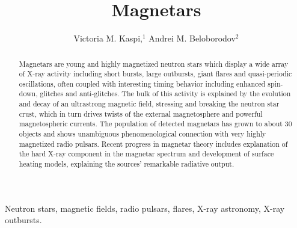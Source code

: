 \documentclass[letterpaper]{ar-1col}
\begin{document}

\title{Magnetars}


\author{Victoria M. Kaspi,$^1$ Andrei M. Beloborodov$^2$
}



\begin{abstract}
Magnetars are young and highly magnetized neutron stars which display
a wide array of X-ray activity including short bursts, large outbursts, giant flares
and quasi-periodic oscillations, often coupled with interesting timing behavior
including enhanced spin-down, glitches and anti-glitches. The bulk of this
activity is explained by the evolution and decay of an ultrastrong magnetic field,
stressing and breaking the neutron star crust, which in turn drives twists of
the external magnetosphere and powerful magnetospheric currents.
The population of detected magnetars has grown to about 30 objects and shows
unambiguous phenomenological connection with very highly magnetized radio pulsars.
Recent progress in magnetar theory includes explanation of the hard X-ray component
in the magnetar spectrum and development of surface heating models, explaining
the sources' remarkable radiative output.
\end{abstract}

\begin{keywords}
Neutron stars, magnetic fields, radio pulsars, flares, X-ray astronomy, X-ray outbursts.
\end{keywords}
\maketitle

\tableofcontents
\end{document}
